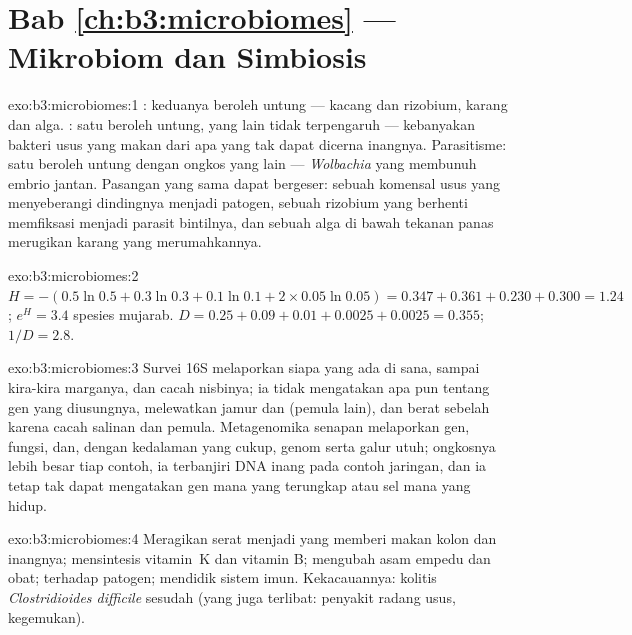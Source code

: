 \section*{Bab \ref{ch:b3:microbiomes} --- Mikrobiom dan Simbiosis}

\begin{solution}{exo:b3:microbiomes:1}
: keduanya beroleh untung --- kacang dan rizobium, karang dan alga.
: satu beroleh untung, yang lain tidak terpengaruh --- kebanyakan
bakteri usus yang makan dari apa yang tak dapat dicerna inangnya. Parasitisme:
satu beroleh untung dengan ongkos yang lain --- \emph{Wolbachia} yang membunuh
embrio jantan. Pasangan yang sama dapat bergeser: sebuah komensal usus yang
menyeberangi dindingnya menjadi patogen, sebuah rizobium yang berhenti
memfiksasi menjadi parasit bintilnya, dan sebuah alga di bawah tekanan panas
merugikan karang yang merumahkannya.
\end{solution}

\begin{solution}{exo:b3:microbiomes:2}
$H = -(0.5\ln 0.5 + 0.3\ln 0.3 + 0.1\ln 0.1 + 2\times 0.05\ln 0.05) =
0.347 + 0.361 + 0.230 + 0.300 = 1.24$; $e^{H} = 3.4$ spesies
mujarab. $D = 0.25 + 0.09 + 0.01 + 0.0025 + 0.0025 = 0.355$; $1/D =
2.8$.
\end{solution}

\begin{solution}{exo:b3:microbiomes:3}
Survei 16S melaporkan siapa yang ada di sana, sampai kira-kira marganya, dan
cacah  nisbinya; ia tidak mengatakan apa pun tentang gen yang
diusungnya, melewatkan jamur dan  (pemula lain), dan berat sebelah karena
cacah salinan dan pemula. Metagenomika senapan melaporkan gen, fungsi, dan,
dengan kedalaman yang cukup, genom serta galur utuh; ongkosnya lebih besar tiap
contoh, ia terbanjiri DNA inang pada contoh jaringan, dan ia tetap tak dapat
mengatakan gen mana yang terungkap atau sel mana yang hidup.
\end{solution}

\begin{solution}{exo:b3:microbiomes:4}
Meragikan serat menjadi  yang memberi makan kolon dan
inangnya; mensintesis vitamin~K dan vitamin B; mengubah asam
empedu dan obat;  terhadap patogen; mendidik
sistem imun. Kekacauannya: kolitis \emph{Clostridioides difficile}
sesudah  (yang juga terlibat: penyakit radang usus,
kegemukan).
\end{solution}

